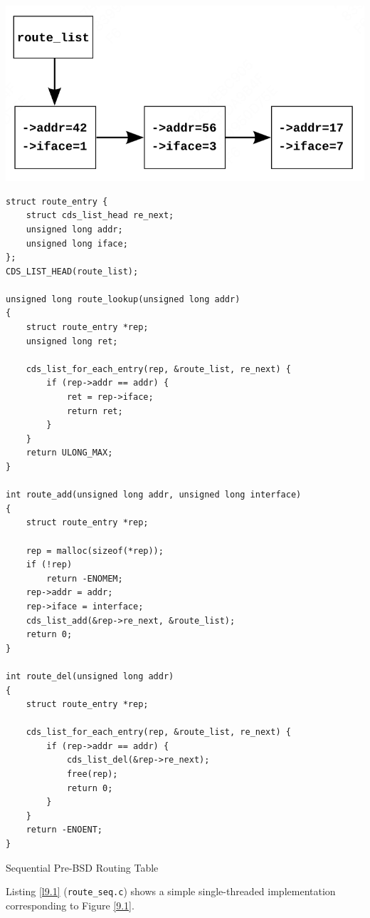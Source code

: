 \documentclass[11pt]{article}
\begin{document}
\begin{center}
\includegraphics[width=.99\textwidth]{../images/perfbook/3.png}
\end{center}

\begin{listing}[htbp]
\begin{verbatim}
struct route_entry {
    struct cds_list_head re_next;
    unsigned long addr;
    unsigned long iface;
};
CDS_LIST_HEAD(route_list);

unsigned long route_lookup(unsigned long addr)
{
    struct route_entry *rep;
    unsigned long ret;

    cds_list_for_each_entry(rep, &route_list, re_next) {
        if (rep->addr == addr) {
            ret = rep->iface;
            return ret;
        }
    }
    return ULONG_MAX;
}

int route_add(unsigned long addr, unsigned long interface)
{
    struct route_entry *rep;

    rep = malloc(sizeof(*rep));
    if (!rep)
        return -ENOMEM;
    rep->addr = addr;
    rep->iface = interface;
    cds_list_add(&rep->re_next, &route_list);
    return 0;
}

int route_del(unsigned long addr)
{
    struct route_entry *rep;

    cds_list_for_each_entry(rep, &route_list, re_next) {
        if (rep->addr == addr) {
            cds_list_del(&rep->re_next);
            free(rep);
            return 0;
        }
    }
    return -ENOENT;
}
\end{verbatim}
\caption{\label{l9.1}Sequential Pre-BSD Routing Table}
\end{listing}

Listing \ref{l9.1} (\texttt{route\_seq.c}) shows a simple single-threaded implementation corresponding to Figure \ref{9.1}.
\end{document}
